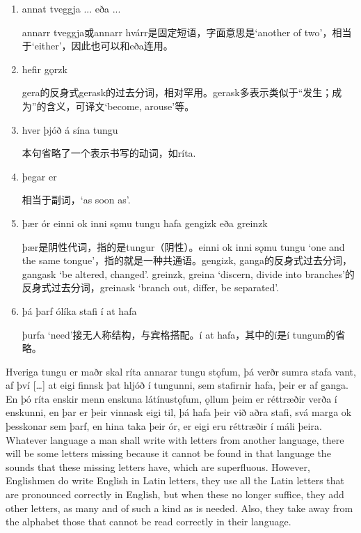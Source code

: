 \begin{grammar*}{}
    \begin{enumerate}[leftmargin=*]
        \item annat tveggja ... eða ...

              annarr tveggja或annarr hvárr是固定短语，字面意思是`another of two'，相当于`either'，因此也可以和eða连用。

        \item hefir gǫrzk

              gera的反身式gerask的过去分词，相对罕用。gerask多表示类似于“发生；成为”的含义，可译文`become, arouse'等。

        \item hver þjóð á sína tungu

              本句省略了一个表示书写的动词，如ríta.

        \item þegar er

              相当于副词，`as soon as'.

        \item þær ór einni ok inni sǫmu tungu hafa gengizk eða greinzk

              þær是阴性代词，指的是tungur（阴性）。einni ok inni sǫmu tungu `one and the same tongue'，指的就是一种共通语。gengizk, ganga的反身式过去分词，gangask `be altered, changed'. greinzk, greina `discern, divide into branches'的反身式过去分词，greinask `branch out, differ, be separated'.

        \item þá þarf ólíka stafi í at hafa

              þurfa `need'接无人称结构，与宾格搭配。í at hafa，其中的í是í tungum的省略。
    \end{enumerate}
\end{grammar*}
\begin{paracol}{2}
    Hveriga tungu er maðr skal ríta annarar tungu stǫfum, þá verðr sumra stafa vant, af því […] at eigi finnsk þat hljóð í tungunni, sem stafirnir hafa, þeir er af ganga. En þó ríta enskir menn enskuna látínustǫfum, ǫllum þeim er réttræðir verða í enskunni, en þar er þeir vinnask eigi til, þá hafa þeir við aðra stafi, svá marga ok þesskonar sem þarf, en hina taka þeir ór, er eigi eru réttræðir í máli þeira.
    \switchcolumn
    Whatever language a man shall write with letters from another language, there will be some letters missing because it cannot be found in that language the sounds that these missing letters have, which are superfluous. However, Englishmen do write English in Latin letters, they use all the Latin letters that are pronounced correctly in English, but when these no longer suffice, they add other letters, as many and of such a kind as is needed. Also, they take away from the alphabet those that cannot be read correctly in their language.
\end{paracol}
